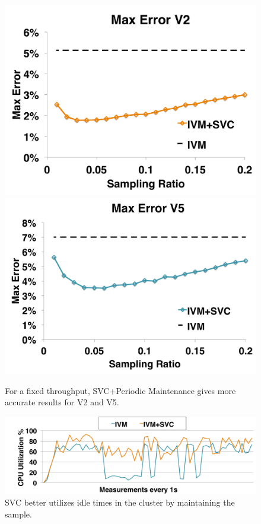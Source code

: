 \begin{figure}[t]\vspace{-2em}
\centering
 \includegraphics[scale=0.12]{exp/con_5.pdf}
 \includegraphics[scale=0.12]{exp/con_6.pdf}\vspace{-0.5em}
 \caption{For a fixed throughput, SVC+Periodic Maintenance gives more accurate results for V2 and V5. \label{conv-4}} 
\end{figure}

\begin{figure}[t]
\centering
\includegraphics[scale=0.11]{exp/con_7.pdf}\vspace{-1em}
 \caption{SVC better utilizes idle times in the cluster by maintaining the sample.\label{conv-5}} 
\end{figure}

